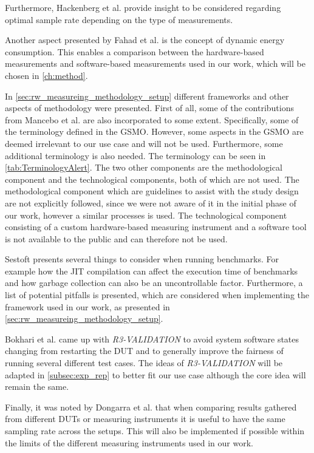 Furthermore, Hackenberg et al.\cite{hackenberg2013} provide insight to be considered regarding optimal sample rate depending on the type of measurements.

Another aspect presented by Fahad et al.\cite{fahad2019comparative} is the concept of dynamic energy consumption. This enables a comparison between the hardware-based measurements and software-based measurements used in our work, which will be chosen in \cref{ch:method}.\newline


In \cref{sec:rw_measureing_methodology_setup} different frameworks and other aspects of methodology were presented. First of all, some of the contributions from Mancebo et al. \cite{GarciaFEETINGS} are also incorporated to some extent. Specifically, some of the terminology defined in the GSMO. However, some aspects in the GSMO are deemed irrelevant to our use case and will not be used. Furthermore, some additional terminology is also needed. The terminology can be seen in \cref{tab:TerminologyAlert}. The two other components are the methodological component and the technological components, both of which are not used. The methodological component which are guidelines to assist with the study design are not explicitly followed, since we were not aware of it in the initial phase of our work, however a similar processes is used. The technological component consisting of a custom hardware-based measuring instrument and a software tool is not available to the public and can therefore not be used.

Sestoft\cite{sestoft2013microbenchmarks} presents several things to consider when running benchmarks. For example how the JIT compilation can affect the execution time of benchmarks and how garbage collection can also be an uncontrollable factor. Furthermore, a list of potential pitfalls is presented, which are considered when implementing the framework used in our work, as presented in \cref{sec:rw_measureing_methodology_setup}.

Bokhari et al.\cite{Bokhari2020r3} came up with \textit{R3-VALIDATION} to avoid system software states changing from restarting the DUT and to generally improve the fairness of running several different test cases. The ideas of \textit{R3-VALIDATION} will be adapted in \cref{subsec:exp_rep} to better fit our use case although the core idea will remain the same.

Finally, it was noted by Dongarra et al.\cite{Dongarra2012} that when comparing results gathered from different DUTs or measuring instruments it is useful to have the same sampling rate across the setups. This will also be implemented if possible within the limits of the different measuring instruments used in our work.

